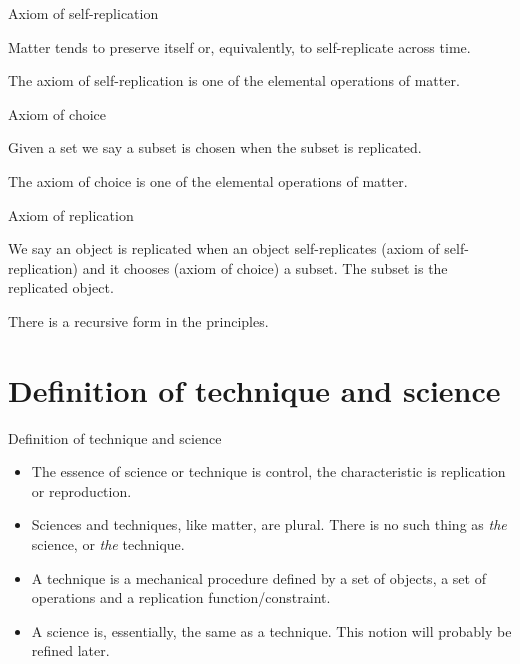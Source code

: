 \documentclass{beamer}
\begin{document}
\begin{frame}{Axiom of self-replication}

\begin{center}
{\Large Matter tends to preserve itself or, equivalently, to self-replicate across time.\\}
\end{center}

The axiom of self-replication is one of the elemental operations of matter.

\end{frame}

\begin{frame}{Axiom of choice}{}

\begin{center}
{\Large Given a set we say a subset is chosen when the subset is replicated.\\}
\end{center}

The axiom of choice is one of the elemental operations of matter.
  
\end{frame}

\begin{frame}{Axiom of replication}

\begin{center}
{\Large We say an object is replicated when an object self-replicates (axiom of self-replication) and it chooses (axiom of choice) a subset. The subset is the replicated object.}
\end{center}

There is a recursive form in the principles.

\end{frame}


\section{Definition of technique and science}

\begin{frame}{Definition of technique and science}{}
  \begin{itemize}
  \item The essence of science or technique is control, the characteristic is replication or reproduction.
  \item Sciences and techniques, like matter, are plural. There is no such thing as \textit{the} science, or \textit{the} technique.
  \item A technique is a mechanical procedure defined by a set of objects, a set of operations and a replication function/constraint.
  \item A science is, essentially, the same as a technique. This notion will probably be refined later.
  \end{itemize}
\end{frame}
\end{document}
